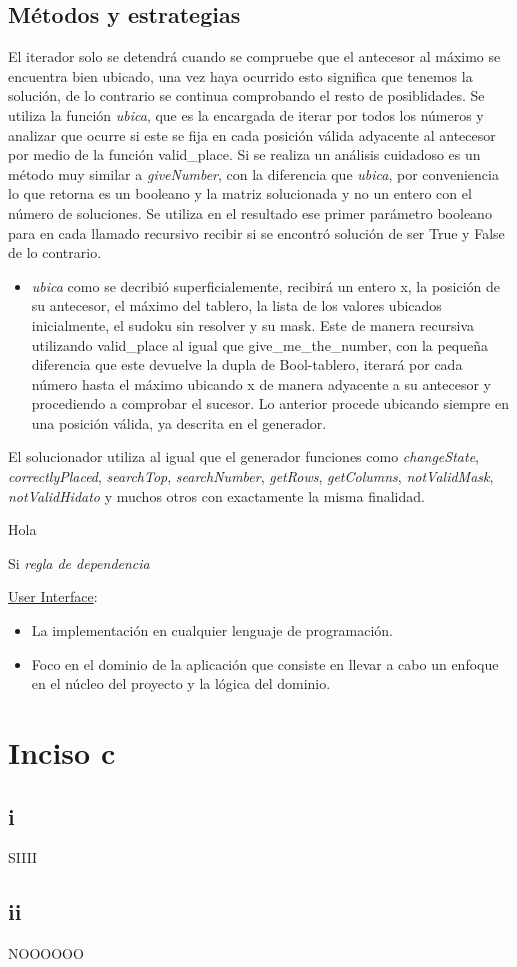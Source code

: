 \documentclass[10pt]{amsart}
\begin{document}
    \subsection*{M\'etodos y estrategias}
	 El iterador solo se detendr\'a cuando se compruebe que el antecesor al m\'aximo se encuentra bien ubicado, una vez haya ocurrido esto significa que tenemos la soluci\'on, de lo contrario se continua comprobando el resto de posiblidades.
	 Se utiliza la funci\'on \textit{ubica}, que es la encargada de iterar por todos los n\'umeros y analizar que ocurre si este se fija en cada posici\'on v\'alida adyacente al antecesor por medio de la funci\'on valid_place. Si se realiza un an\'alisis cuidadoso es un m\'etodo muy similar a \textit{giveNumber}, con la diferencia que \textit{ubica}, por conveniencia lo que retorna es un booleano y la matriz solucionada y no un entero con el n\'umero de soluciones. Se utiliza en el resultado ese primer parámetro booleano para en cada llamado recursivo recibir si se encontró solución de ser True y False de lo contrario.	
   \begin{itemize}
	 \item \textit{ubica} como se decribi\'o superficialemente, recibir\'a un entero x, la posici\'on de su antecesor, el m\'aximo del tablero, la lista de los valores ubicados inicialmente, el sudoku sin resolver y su mask. Este de manera recursiva utilizando valid_place al igual que give_me_the_number, con la pequeña diferencia que este devuelve la dupla de Bool-tablero, iterar\'a por cada n\'umero hasta el m\'aximo ubicando x de manera adyacente a su antecesor y procediendo a comprobar el sucesor. Lo anterior procede ubicando siempre en una posici\'on v\'alida, ya descrita en el generador. 
	 \end{itemize}
     El solucionador utiliza al igual que el generador funciones como \textit{changeState}, \textit{correctlyPlaced}, \textit{searchTop}, \textit{searchNumber}, \textit{getRows}, \textit{getColumns}, \textit{notValidMask}, \textit{notValidHidato} y muchos otros con exactamente la misma finalidad. 
	
	Hola
	
	Si \textit{regla de dependencia}
	
	
	\underline{User Interface}: 
	
	\begin{itemize}			
		\item La implementación en cualquier lenguaje de programación.
		\item Foco en el dominio de la aplicación que consiste en llevar a cabo un enfoque en el núcleo del proyecto y la lógica del dominio.
	\end{itemize}
	
	
	\section*{Inciso c}
	\subsection*{i}
        SIIII
 
	\subsection*{ii}
	NOOOOOO
 
	
\end{document}
